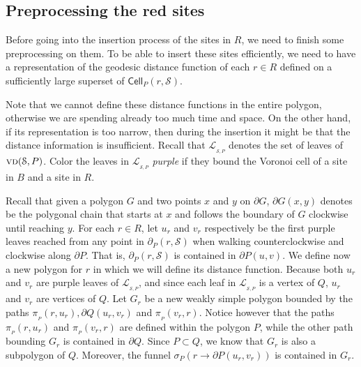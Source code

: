 \documentclass[a4paper,UKenglish]{socg-lipics-v2018}
\newcommand{\s}{\mathcal S}
\newcommand{\p}[3][P]{\ensuremath{\pi_{_{#1}}(#2, #3)}}
\newcommand{\funnel}[2][P]{\ensuremath{\sigma_{\scriptscriptstyle #1}(#2)}}
\newcommand{\cell}[2][P]{\ensuremath{\mathsf{Cell}_{\scriptscriptstyle #1}(#2)}}
\newcommand{\bcell}[2][P]{\ensuremath{\partial_{\scriptscriptstyle #1}(#2)}}
\newcommand{\vd}[2][P]{\textsc{vd}(#2, #1)}
\newcommand{\LL}[1][\s, P]{\ensuremath{\mathcal L_{_{#1}}}}
\begin{document}
\subsection{Preprocessing the red sites}
Before going into the insertion process of the sites in $R$, we need to finish some preprocessing on them.
To be able to insert these sites efficiently, we need to have a representation of the geodesic distance function of each $r\in R$ defined on a sufficiently large superset of $\cell{r, \s}$. 

Note that we cannot define these distance functions in the entire polygon, otherwise we are spending already too much time and space.
On the other hand, if its representation is too narrow, then during the insertion it might be that the distance information is insufficient.
Recall that $\LL$ denotes the set of leaves of $\vd{\s}$.
Color the leaves in $\LL$ \emph{purple} if they bound the Voronoi cell of a site in $B$ and a site in $R$. 




Recall that given a polygon $G$ and two points $x$ and $y$ on $\partial G$, $\partial G(x,y)$ denotes be the polygonal chain that starts at $x$ and follows the boundary of $G$ clockwise until reaching $y$.
For each $r\in R$, let $u_r$ and $v_r$ respectively be the first purple leaves reached from any point in $\bcell{r, \s}$ when walking counterclockwise and clockwise along $\partial P$. 
That is, $\bcell{r,\s}$ is contained in $\partial P(u,v)$. 
We define now a new polygon for $r$ in which we will define its distance function.
Because both $u_r$ and $v_r$ are purple leaves of $\LL$, and since each leaf in $\LL$ is a vertex of $Q$, $u_r$ and $v_r$ are vertices of $Q$. 
Let $G_r$ be a new weakly simple polygon bounded by the paths $\p{r}{u_r}, \partial Q(u_r, v_r)$ and $\p{v_r}{r}$. 
Notice however that the paths $\p{r}{u_r}$ and $\p{v_r}{r}$ are defined within the polygon $P$, while the other path bounding $G_r$ is contained in $\partial Q$. 
Since $P\subset Q$, we know that $G_r$ is also a subpolygon of $Q$. Moreover, the funnel $\funnel{r\to \partial P(u_r, v_r)}$ is contained in $G_r$.
\end{document}
